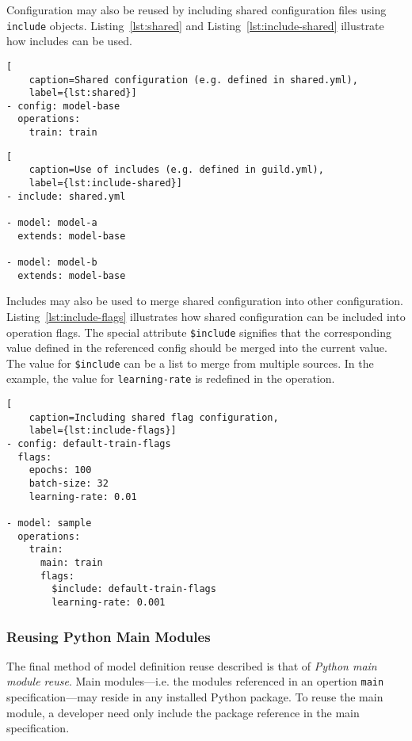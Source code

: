 \documentclass{article}
\begin{document}
Configuration may also be reused by including shared configuration
files using \verb|include| objects. Listing~\ref{lst:shared} and
Listing~\ref{lst:include-shared} illustrate how includes can be used.

\begin{lstlisting}[
    caption=Shared configuration (e.g. defined in shared.yml),
    label={lst:shared}]
- config: model-base
  operations:
    train: train
\end{lstlisting}

\begin{lstlisting}[
    caption=Use of includes (e.g. defined in guild.yml),
    label={lst:include-shared}]
- include: shared.yml

- model: model-a
  extends: model-base

- model: model-b
  extends: model-base
\end{lstlisting}

Includes may also be used to merge shared configuration into other
configuration. Listing~\ref{lst:include-flags} illustrates how shared
configuration can be included into operation flags. The special
attribute \verb|$include| signifies that the corresponding value
defined in the referenced config should be merged into the current
value. The value for \verb|$include| can be a list to merge from
multiple sources. In the example, the value for \verb|learning-rate|
is redefined in the operation.

\begin{lstlisting}[
    caption=Including shared flag configuration,
    label={lst:include-flags}]
- config: default-train-flags
  flags:
    epochs: 100
    batch-size: 32
    learning-rate: 0.01

- model: sample
  operations:
    train:
      main: train
      flags:
        $include: default-train-flags
        learning-rate: 0.001
\end{lstlisting}

\subsubsection{Reusing Python Main Modules}

The final method of model definition reuse described is that of
\emph{Python main module reuse}. Main modules---i.e. the modules
referenced in an opertion \verb|main| specification---may reside in
any installed Python package. To reuse the main module, a developer
need only include the package reference in the main specification.
\end{document}

